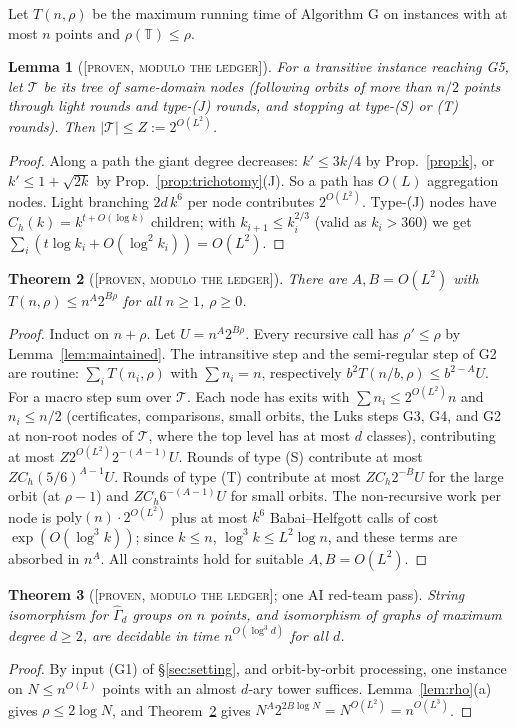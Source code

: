 \documentclass[11pt]{article}
\newtheorem{theorem}{Theorem}[section]
\newtheorem{lemma}[theorem]{Lemma}
\theoremstyle{definition}
\theoremstyle{remark}
\newcommand{\T}{\mathbb T}
\newcommand{\Gammahat}{\widehat\Gamma}
\newcommand{\ProvenM}{\textsc{[proven, modulo the ledger]}}
\begin{document}
Let $T(n,\rho)$ be the maximum running time of Algorithm G on instances with at most $n$ points and $\rho(\T)\le\rho$.

\begin{lemma}[\ProvenM]\label{lem:Z}
For a transitive instance reaching \textup{G5}, let $\mathcal T$ be its tree of same-domain nodes (following orbits of more than $n/2$ points through light rounds and type-\textup{(J)} rounds, and stopping at type-\textup{(S)} or \textup{(T)} rounds). Then $|\mathcal T|\le Z:=2^{O(L^2)}$.
\end{lemma}
\begin{proof}
Along a path the giant degree decreases: $k'\le 3k/4$ by Prop.~\ref{prop:k}, or $k'\le1+\sqrt{2k}$ by Prop.~\ref{prop:trichotomy}(J). So a path has $O(L)$ aggregation nodes. Light branching $2d\,k^6$ per node contributes $2^{O(L^2)}$. Type-(J) nodes have $C_h(k)=k^{t+O(\log k)}$ children; with $k_{i+1}\le k_i^{2/3}$ (valid as $k_i>360$) we get $\sum_i(t\log k_i+O(\log^2k_i))=O(L^2)$.
\end{proof}

\begin{theorem}[\ProvenM]\label{thm:T}
There are $A,B=O(L^2)$ with $T(n,\rho)\le n^A2^{B\rho}$ for all $n\ge1$, $\rho\ge0$.
\end{theorem}
\begin{proof}
Induct on $n+\rho$. Let $U=n^A2^{B\rho}$. Every recursive call has $\rho'\le\rho$ by Lemma~\ref{lem:maintained}. The intransitive step and the semi-regular step of G2 are routine: $\sum_iT(n_i,\rho)$ with $\sum n_i=n$, respectively $b^2T(n/b,\rho)\le b^{2-A}U$. For a macro step sum over $\mathcal T$. Each node has exits with $\sum n_i\le2^{O(L^2)}n$ and $n_i\le n/2$ (certificates, comparisons, small orbits, the Luks steps G3, G4, and G2 at non-root nodes of $\mathcal T$, where the top level has at most $d$ classes), contributing at most $Z2^{O(L^2)}2^{-(A-1)}U$. Rounds of type (S) contribute at most $ZC_h(5/6)^{A-1}U$. Rounds of type (T) contribute at most $ZC_h2^{-B}U$ for the large orbit (at $\rho-1$) and $ZC_h6^{-(A-1)}U$ for small orbits. The non-recursive work per node is $\mathrm{poly}(n)\cdot2^{O(L^2)}$ plus at most $k^6$ Babai--Helfgott calls of cost $\exp(O(\log^3k))$; since $k\le n$, $\log^3k\le L^2\log n$, and these terms are absorbed in $n^A$. All constraints hold for suitable $A,B=O(L^2)$.
\end{proof}

\begin{theorem}[\ProvenM; one AI red-team pass]\label{thm:G}
String isomorphism for $\Gammahat_d$ groups on $n$ points, and isomorphism of graphs of maximum degree $d\ge2$, are decidable in time $n^{O(\log^3d)}$ for all $d$.
\end{theorem}
\begin{proof}
By input (G1) of \S\ref{sec:setting}, and orbit-by-orbit processing, one instance on $N\le n^{O(L)}$ points with an almost $d$-ary tower suffices. Lemma~\ref{lem:rho}(a) gives $\rho\le2\log N$, and Theorem~\ref{thm:T} gives $N^{A}2^{2B\log N}=N^{O(L^2)}=n^{O(L^3)}$.
\end{proof}
\end{document}
